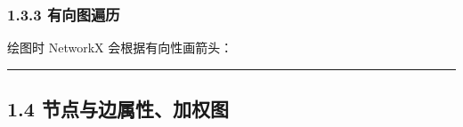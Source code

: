 \begin{Shaded}
\begin{Highlighting}[]
\end{Highlighting}
\end{Shaded}

\subsubsection{1.3.3 有向图遍历}\label{ux6709ux5411ux56feux904dux5386}

\begin{Shaded}
\begin{Highlighting}[]
\NormalTok{(}\OperatorTok{=}\NormalTok{)))}
\NormalTok{(}\OperatorTok{=}\NormalTok{)))}
\end{Highlighting}
\end{Shaded}

\begin{Shaded}
\begin{Highlighting}[]
\NormalTok{[1, 2, 3, 4]}
\NormalTok{[(1, 2), (2, 3), (3, 4)]}
\end{Highlighting}
\end{Shaded}

绘图时 NetworkX 会根据有向性画箭头：

\begin{Shaded}
\begin{Highlighting}[]
\OperatorTok{=}\OperatorTok{=}\OperatorTok{=}\OperatorTok{=}\NormalTok{)}
\end{Highlighting}
\end{Shaded}

\begin{center}\rule{0.5\linewidth}{0.5pt}\end{center}

\subsection{1.4
节点与边属性、加权图}\label{ux8282ux70b9ux4e0eux8fb9ux5c5eux6027ux52a0ux6743ux56fe}

